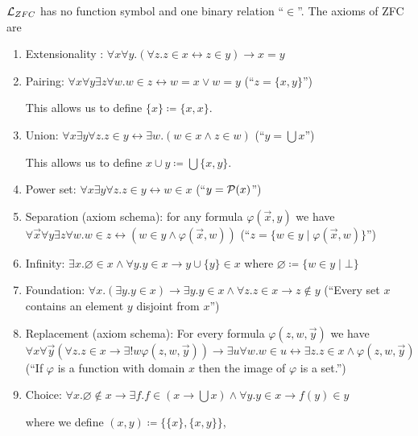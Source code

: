 \begin{boxdef}
\begin{defi}
    \alert{$\mathcal{L}_{ZFC}$} has no function symbol and one binary relation ``$\in$''. 
    The axioms of ZFC are
    \begin{enumerate}
        \item Extensionality : $\forall x \forall y. (\forall z. z \in x \leftrightarrow z \in y) \to x = y$
        \item Pairing: $\forall x \forall y \exists z \forall w. w \in z \leftrightarrow w = x \lor w = y$ (``$z = \{x,y\}$'')
        
        This allows us to define $\{x\} \coloneq \{x, x\}$.
        \item Union: $\forall x \exists y \forall z. z \in y \leftrightarrow \exists w. (w \in x \wedge z \in w)$ (``$y = \bigcup x$'')
        
        This allows us to define $x \cup y \coloneq \bigcup \{x, y\}$.
        \item Power set: $\forall x \exists y \forall z. z \in y \leftrightarrow w \in x$ (``$y = \mathcal{P}(x)$'')
        \item Separation (axiom schema): for any formula $\varphi(\vec{x}, y)$ we have $\forall \vec{x} \forall y \exists z \forall w. w \in z \leftrightarrow (w \in y \wedge \varphi(\vec{x}, w))$ (``$z = \{ w \in y \mid \varphi(\vec{x}, w)\}$'')
        \item Infinity: $\exists x. \varnothing \in x \wedge \forall y. y \in x \to y \cup \{y\} \in x$ where $\varnothing \coloneq \{w \in y \mid \bot\}$
        \item Foundation: $\forall x. (\exists y. y \in x) \to \exists y. y \in x \wedge \forall z. z \in x \to z \notin y$ (``Every set $x$ contains an element $y$ disjoint from $x$'')
        \item Replacement (axiom schema): For every formula $\varphi(z, w, \vec{y})$ we have $\forall x \forall \vec{y} (\forall z. z \in x \to \exists! w \varphi(z, w, \vec{y})) \to \exists u \forall w. w \in u \leftrightarrow \exists z. z \in x \wedge \varphi(z, w, \vec{y})$ (``If $\varphi$ is a function with domain $x$ then the image of $\varphi$ is a set.'')
        \item Choice: $\forall x. \varnothing \notin x \to \exists f. f \in (x \to \bigcup x) \wedge \forall y. y \in x  \to f(y) \in y$
        
        where we define $(x , y) \coloneq \{\{x\}, \{x, y\}\}$, 
        

\end{enumerate}
\end{defi}
\end{boxdef}
